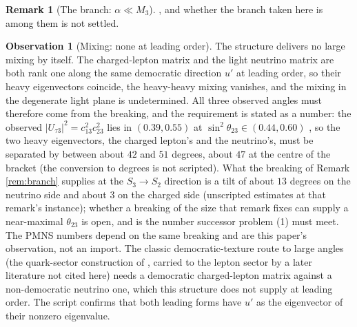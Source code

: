 \documentclass[11pt]{article}
\theoremstyle{definition}
\newtheorem{remark}[theorem]{Remark}
\newtheorem{observation}[theorem]{Observation}
\begin{document}
\begin{remark}[The branch: $\alpha \ll M_{3}$]
\cite[Obs.~11.7]{ButlerT12}, and whether the branch taken here is among them is not settled.
\end{remark}

\begin{observation}[Mixing: none at leading order]\label{obs:mixing}
The structure delivers no large mixing by itself. The charged-lepton matrix and the light neutrino matrix are both rank one along the same democratic direction $u'$ at leading order, so their heavy eigenvectors coincide, the heavy-heavy mixing vanishes, and the mixing in the degenerate light plane is undetermined. All three observed angles must therefore come from the breaking, and the requirement is stated as a number: the observed $|U_{\tau 3}|^{2} = c_{13}^{2}c_{23}^{2}$ lies in $(0.39, 0.55)$ at $\sin^{2}\theta_{23} \in (0.44, 0.60)$ \cite{NuFIT2024}, so the two heavy eigenvectors, the charged lepton's and the neutrino's, must be separated by between about $42$ and $51$ degrees, about $47$ at the centre of the bracket (the conversion to degrees is not scripted). What the breaking of Remark \ref{rem:branch} supplies at the $S_{3} \to S_{2}$ direction is a tilt of about $13$ degrees on the neutrino side and about $3$ on the charged side (unscripted estimates at that remark's instance); whether a breaking of the size that remark fixes can supply a near-maximal $\theta_{23}$ is open, and is the number successor problem (1) must meet. The PMNS numbers depend on the same breaking and are this paper's observation, not an import. The classic democratic-texture route to large angles (the quark-sector construction of \cite{HHW1978}, carried to the lepton sector by a later literature not cited here) needs a democratic charged-lepton matrix against a non-democratic neutrino one, which this structure does not supply at leading order. The script confirms that both leading forms have $u'$ as the eigenvector of their nonzero eigenvalue.
\end{observation}
\end{document}
